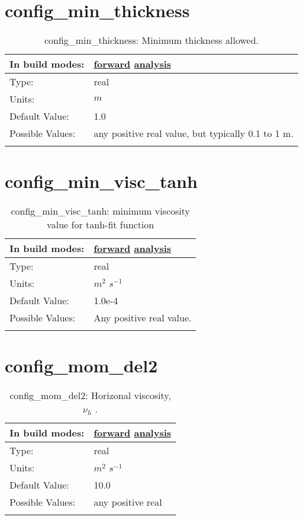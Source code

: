 \section[config\_min\_thickness]{config\_min\_thickness}
\label{sec:nm_sec_config_min_thickness}
\begin{center}
\begin{longtable}{| p{2.0in} || p{4.0in} |}
    \hline
    In build modes: & \hyperref[subsec:forward_nm_tab_ALE_vertical_grid]{forward} \hyperref[subsec:analysis_nm_tab_ALE_vertical_grid]{analysis} \\
    \hline
    Type: & real \\
    \hline
    Units: & $m$ \\
    \hline
    Default Value: & 1.0 \\
    \hline
    Possible Values: & any positive real value, but typically 0.1 to 1 m. \\
    \hline
    \caption{config\_min\_thickness: Minimum thickness allowed.}
\end{longtable}
\end{center}
\section[config\_min\_visc\_tanh]{config\_min\_visc\_tanh}
\label{sec:nm_sec_config_min_visc_tanh}
\begin{center}
\begin{longtable}{| p{2.0in} || p{4.0in} |}
    \hline
    In build modes: & \hyperref[subsec:forward_nm_tab_vmix_tanh]{forward} \hyperref[subsec:analysis_nm_tab_vmix_tanh]{analysis} \\
    \hline
    Type: & real \\
    \hline
    Units: & $m^2$ $s^{-1}$ \\
    \hline
    Default Value: & 1.0e-4 \\
    \hline
    Possible Values: & Any positive real value. \\
    \hline
    \caption{config\_min\_visc\_tanh: minimum viscosity value for tanh-fit function}
\end{longtable}
\end{center}
\section[config\_mom\_del2]{config\_mom\_del2}
\label{sec:nm_sec_config_mom_del2}
\begin{center}
\begin{longtable}{| p{2.0in} || p{4.0in} |}
    \hline
    In build modes: & \hyperref[subsec:forward_nm_tab_hmix_del2]{forward} \hyperref[subsec:analysis_nm_tab_hmix_del2]{analysis} \\
    \hline
    Type: & real \\
    \hline
    Units: & $m^2$ $s^{-1}$ \\
    \hline
    Default Value: & 10.0 \\
    \hline
    Possible Values: & any positive real \\
    \hline
    \caption{config\_mom\_del2:  Horizonal viscosity,  $\nu_h$ .}
\end{longtable}
\end{center}
